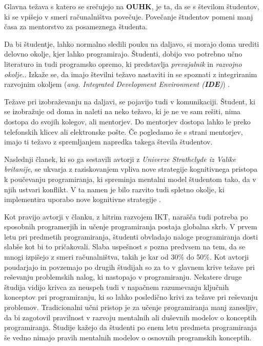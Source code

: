 Glavna težava s katero se srečujejo na \textbf{OUHK}, je ta, da se s
številom študentov, ki se vpišejo v smeri računalništva
povečuje. Povečanje študentov pomeni manj časa za mentorstvo za
posameznega študenta.

Da bi študentje, lahko normalno sledili pouku na daljavo, si morajo
doma urediti delovno okolje, kjer lahko programirajo. Študenti,
dobijo vso potrebno učno literaturo in tudi programsko opremo, ki
predstavlja \emph{prevajalnik} in \emph{razvojno okolje.}. Izkaže se,
da imajo številni težavo nastaviti in se spoznati z integriranim
razvojnim okoljem (\emph{ang. Integrated Development Environment
  (\textbf{IDE})}) \cite{ITaLCP_DistanceEdu}.

Težave pri izobraževanju na daljavi, se pojavijo tudi v
komunikaciji. Študent, ki se izobražuje od doma in naleti na neko
težavo, ki je ne ve sam rešiti, nima dostopa do svojih kolegov, ali
mentorjev. Do mentorjev dostopa lahko le preko telefonskih klicev ali
elektronske pošte. Če pogledamo še s strani mentorjev, imajo ti težavo
z spremljanjem napredka takega števila študentov.


Naslednji članek, ki so ga sestavili avtorji z \emph{Univerze
  Strathclyde iz Valike britanije}, se ukvarja z raziskovanjem vpliva
nove strategije kognitivnega pristopa k poučevanju programiranja, ki
spreminja mentalni model študentom tako, da v njih ustvari konflikt. V
ta namen je bilo razvito tudi spletno okolje, ki implementira uporabo
nove kognitivne strategije \cite{mentalModels}.


Kot pravijo avtorji v članku, z hitrim razvojem IKT, narašča tudi
potreba po sposobnih programerjih in učenje programiranja postaja
globalna skrb. V prvem letu pri predmetih programiranja, študenti
obvladajo naloge programiranja dosti slabše kot bi to
pričakovali. Slaba uspešnost s pozna predvsem na tem, da se mnogi
izpišejo z smeri računalništva, takih je kar od 30\% do 50\%. Kot
avtorji poudarjajo in povzemajo po drugih študijah so za to v glavnem
krive težave pri reševanju problemskih nalog, ki nastopajo v
programiranju. Nekatere druge študija vidijo krivca za neuspeh tudi v
napačnem razumevanju ključnih konceptov pri programiranju, ki so lahko
posledično krivi za težave pri reševanju problemov. Tradicionalni učni
pristop je za učenje programiranja manj zanesljiv, da bi zagotovil
pravilnost v razvoju mentalnih ali duševnih modelov o
konceptih programiranja. Študije kažejo da študenti po enem letu
predmeta programiranja še vedno nimajo pravih mentalnih modelov o
osnovnih programskih konceptih.

